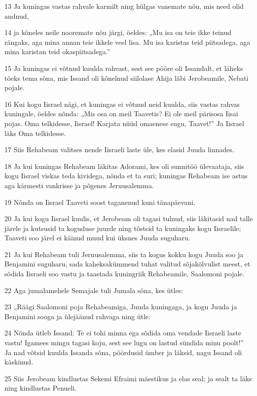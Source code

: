 \par 13 Ja kuningas vastas rahvale karmilt ning hülgas vanemate nõu, mis need olid andnud,
\par 14 ja kõneles neile nooremate nõu järgi, öeldes: „Mu isa on teie ikke teinud rängaks, aga mina annan teie ikkele veel lisa. Mu isa karistas teid piitsadega, aga mina karistan teid okaspiitsadega.”
\par 15 Ja kuningas ei võtnud kuulda rahvast, sest see pööre oli Issandalt, et läheks tõeks tema sõna, mis Issand oli kõnelnud siilolase Ahija läbi Jerobeamile, Nebati pojale.
\par 16 Kui kogu Iisrael nägi, et kuningas ei võtnud neid kuulda, siis vastas rahvas kuningale, öeldes nõnda: „Mis osa on meil Taavetis? Ei ole meil pärisosa Iisai pojas. Oma telkidesse, Iisrael! Karjata nüüd omaenese sugu, Taavet!” Ja Iisrael läks Oma telkidesse.
\par 17 Siis Rehabeam valitses nende Iisraeli laste üle, kes elasid Juuda linnades.
\par 18 Ja kui kuningas Rehabeam läkitas Adorami, kes oli sunnitöö ülevaataja, siis kogu Iisrael viskas teda kividega, nõnda et ta suri; kuningas Rehabeam ise astus aga kärmesti vankrisse ja põgenes Jeruusalemma.
\par 19 Nõnda on Iisrael Taaveti soost taganenud kuni tänapäevani.
\par 20 Ja kui kogu Iisrael kuulis, et Jerobeam oli tagasi tulnud, siis läkitasid nad talle järele ja kutsusid ta koguduse juurde ning tõstsid ta kuningaks kogu Iisraelile; Taaveti soo järel ei käinud muud kui üksnes Juuda suguharu.
\par 21 Ja kui Rehabeam tuli Jeruusalemma, siis ta kogus kokku kogu Juuda soo ja Benjamini suguharu, sada kaheksakümmend tuhat valitud sõjakõlvulist meest, et sõdida Iisraeli soo vastu ja taastada kuningriik Rehabeamile, Saalomoni pojale.
\par 22 Aga jumalamehele Semajale tuli Jumala sõna, kes ütles:
\par 23 „Räägi Saalomoni poja Rehabeamiga, Juuda kuningaga, ja kogu Juuda ja Benjamini sooga ja ülejäänud rahvaga ning ütle:
\par 24 Nõnda ütleb Issand: Te ei tohi minna ega sõdida oma vendade Iisraeli laste vastu! Igamees mingu tagasi koju, sest see lugu on lastud sündida minu poolt!” Ja nad võtsid kuulda Issanda sõna, pöördusid ümber ja läksid, nagu Issand oli käskinud.
\par 25 Siis Jerobeam kindlustas Sekemi Efraimi mäestikus ja elas seal; ja sealt ta läks ning kindlustas Penueli.
